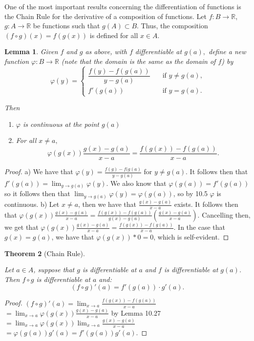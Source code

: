 \documentclass[12pt]{article}
\newcommand{\bbR}{\mathbb{R}}
\renewcommand{\phi}{\varphi}
\renewcommand{\_}[1]{\underline{ #1 }}
\newtheorem{theorem}{Theorem}[section]
\newtheorem{lemma}[theorem]{Lemma}
\theoremstyle{definition}
\numberwithin{equation}{subsection}
\begin{document}
One of the most important results concerning the differentiation of functions is the Chain Rule
for the derivative of a composition of functions.
Let $f:B\to\bbR$, $g:A\to\bbR$ be functions such that $g(A)\subset B$.  
Thus, the composition $(f \circ g)(x) = f(g(x))$ is defined for all $x\in A$. 


\begin{lemma} 
Given $f$ and $g$ as above, with $f$ differentiable at $g(a),$ 
define a new function $\phi:B\to\bbR$ (note that the domain is the same as the domain of $f$) by
\[
\phi(y) = \begin{cases}
\dfrac{f(y) - f(g(a))}{y - g(a)} \quad &\text{if $y\neq g(a)$,} \\
f'(g(a)) \quad &\text{if $y = g(a)$.} 
\end{cases}
\]

Then 
\begin{enumerate}
\item[a)]$\phi$ is continuous at the point $g(a)$  
\item[b)] For all $x\neq a,$
$$\phi(g(x))\frac{g(x)-g(a)}{x-a}=\frac{f(g(x))-f(g(a))}{x-a}.$$
\end{enumerate}
\end{lemma}

\begin{proof}
a) We have that $\phi(y) = \frac{f(g) - f(g(a)}{y - g(a)}$ for $y \not = g(a)$. It follows then that $f'(g(a)) = \lim_{y \to g(a)} \phi(y)$. We also know that $\phi(g(a)) = f'(g(a))$ so it follows then that $\lim_{y \to g(a)}\phi(y) = \phi(g(a))$, so by 10.5 $\phi$ is continuous. \newline
b) Let $x \not = a$, then we have that $\frac{g(x) - g(a)}{x - a}$ exists. It follows then that $\phi(g(x))\frac{g(x) - g(a)}{x-a} = \frac{f(g(x)) - f(g(a))}{g(x) - g(a)}(\frac{g(x) - g(a)}{x - a})$. Cancelling then, we get that $\phi(g(x))\frac{g(x) - g(a)}{x-a} = \frac{f(g(x)) - f(g(a))}{x - a}$. In the case that $g(x) = g(a)$, we have that $\phi(g(x)) * 0 = 0$, which is self-evident.
\end{proof}


\begin{theorem}[Chain Rule] \label{thm-chain-rule} 

Let $a\in A$, suppose that $g$ is differentiable at $a$ and $f$ is differentiable at $g(a)$.  
Then $f \circ g$ is differentiable at $a$ and:
\[
(f \circ g)'(a) = f'(g(a)) \cdot g'(a).
\]
\end{theorem}

\begin{proof}
$(f \circ g)'(a) = \lim_{x \to a}\frac{f(g(x)) - f(g(a))}{x - a}$ \newline
$ = \lim_{x \to a} \phi(g(x))\frac{g(x) - g(a)}{x - a}$ by Lemma 10.27 \newline
$ = \lim_{x \to a} \phi(g(x)) \lim_{x \to a}\frac{g(x) - g(a)}{x-a}$ \newline
$= \phi(g(a))g'(a) = f'(g(a))g'(a)$.
\end{proof}
\end{document}
